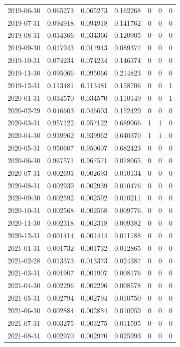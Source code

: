 \documentclass[conference,onecolumn]{IEEEtran}
\begin{document}
\begin{longtable}{|c|c|c|c|c|c|c|}
2019-06-30 & 0.065273 & 0.065273 & 0.162268 & 0 & 0 & 0 \\
2019-07-31 & 0.094918 & 0.094918 & 0.141762 & 0 & 0 & 0 \\
2019-08-31 & 0.034366 & 0.034366 & 0.120905 & 0 & 0 & 0 \\
2019-09-30 & 0.017943 & 0.017943 & 0.089377 & 0 & 0 & 0 \\
2019-10-31 & 0.074234 & 0.074234 & 0.146374 & 0 & 0 & 0 \\
2019-11-30 & 0.095066 & 0.095066 & 0.214823 & 0 & 0 & 0 \\
2019-12-31 & 0.113481 & 0.113481 & 0.158706 & 0 & 0 & 1 \\
2020-01-31 & 0.034570 & 0.034570 & 0.110149 & 0 & 0 & 1 \\
2020-02-29 & 0.046603 & 0.046603 & 0.152429 & 0 & 0 & 0 \\
2020-03-31 & 0.957122 & 0.957122 & 0.689966 & 1 & 1 & 0 \\
2020-04-30 & 0.939962 & 0.939962 & 0.640370 & 1 & 1 & 0 \\
2020-05-31 & 0.950607 & 0.950607 & 0.682423 & 0 & 0 & 0 \\
2020-06-30 & 0.967571 & 0.967571 & 0.078065 & 0 & 0 & 0 \\
2020-07-31 & 0.002693 & 0.002693 & 0.010134 & 0 & 0 & 0 \\
2020-08-31 & 0.002939 & 0.002939 & 0.010476 & 0 & 0 & 0 \\
2020-09-30 & 0.002592 & 0.002592 & 0.010211 & 0 & 0 & 0 \\
2020-10-31 & 0.002568 & 0.002568 & 0.009776 & 0 & 0 & 0 \\
2020-11-30 & 0.002318 & 0.002318 & 0.009382 & 0 & 0 & 0 \\
2020-12-31 & 0.001414 & 0.001414 & 0.011788 & 0 & 0 & 0 \\
2021-01-31 & 0.001732 & 0.001732 & 0.012865 & 0 & 0 & 0 \\
2021-02-28 & 0.013373 & 0.013373 & 0.024387 & 0 & 0 & 0 \\
2021-03-31 & 0.001907 & 0.001907 & 0.008176 & 0 & 0 & 0 \\
2021-04-30 & 0.002296 & 0.002296 & 0.008578 & 0 & 0 & 0 \\
2021-05-31 & 0.002794 & 0.002794 & 0.010750 & 0 & 0 & 0 \\
2021-06-30 & 0.002884 & 0.002884 & 0.010959 & 0 & 0 & 0 \\
2021-07-31 & 0.003275 & 0.003275 & 0.011595 & 0 & 0 & 0 \\
2021-08-31 & 0.002970 & 0.002970 & 0.025993 & 0 & 0 & 0 \\

\end{longtable}
\end{document}
